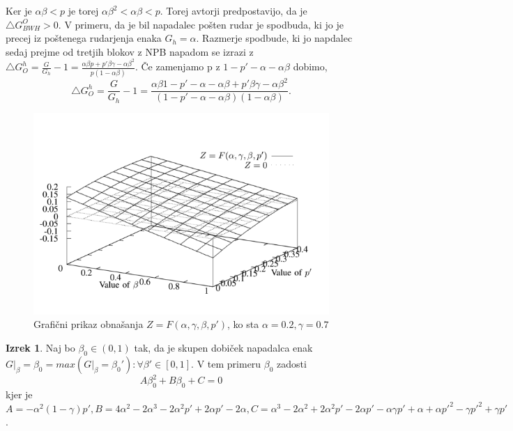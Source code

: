 \documentclass{acm_proc_article-sp}
\begin{document}
Ker je $ \alpha\beta < p $ je torej $ \alpha\beta^2 < \alpha\beta < p $. Torej avtorji predpostavijo, da je $ \bigtriangleup G_{BWH}^O > 0.$ V primeru, da je bil napadalec pošten rudar je spodbuda, ki jo je precej iz poštenega rudarjenja enaka $G_h = \alpha$. Razmerje spodbude, ki jo napdalec sedaj prejme od tretjih blokov z NPB napadom se izrazi z $\bigtriangleup G_O^h = \frac{G}{G_h} - 1 = \frac{\alpha\beta p + p' \beta\gamma - \alpha\beta^2}{p(1 - \alpha\beta)}$. Če zamenjamo p z $ 1 - p' - \alpha - \alpha\beta$ dobimo,
\begin{equation} \label{eq:4}
\bigtriangleup G_O^h = \frac{G}{G_h} - 1 = \frac{\alpha\beta 1 - p' - \alpha - \alpha\beta + p' \beta\gamma - \alpha\beta^2}{(1 - p' - \alpha - \alpha\beta)(1 - \alpha\beta)}.
\end{equation}
\newline
\begin{figure}
  \includegraphics[scale=0.4]{image1.png}
  \caption{Grafični prikaz obnašanja $Z = F(\alpha, \gamma, \beta, p')$, ko sta $\alpha = 0.2, \gamma = 0.7$}
  \label{fig:boat1}
\end{figure}
\newline
\textbf{Izrek 1}. Naj bo $ \beta_0 \in (0, 1) $ tak, da je skupen dobiček napadalca enak $G|_\beta=\beta_0 = max(G|_\beta=\beta_0'): \forall\beta' \in [0,1]$. V tem primeru $\beta_0$ zadosti
\begin{equation}
A \beta_0^2 + B\beta_0 + C = 0
\end{equation}
kjer je $A = -\alpha^2(1 - \gamma)p', B = 4\alpha^2 - 2\alpha^3 - 2\alpha^2p' + 2\alpha p' - 2\alpha, C = \alpha^3 - 2\alpha^2 + 2\alpha^2 p' - 2\alpha p' - \alpha\gamma p' + \alpha + \alpha p'^2 - \gamma p'^2 + \gamma p' $.
\end{document}

